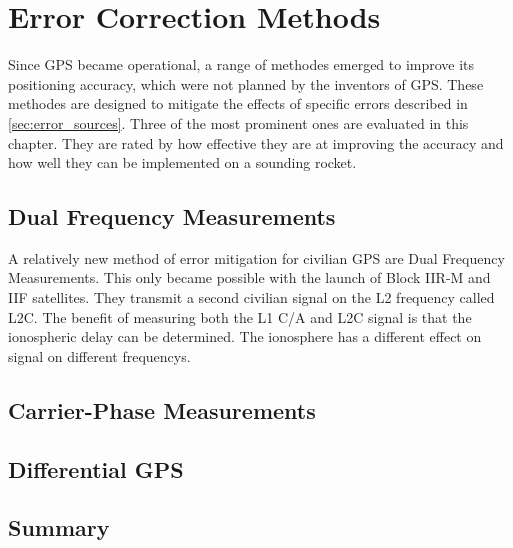 \chapter{Error Correction Methods}

Since GPS became operational, a range of methodes emerged to improve its positioning accuracy, which were not planned by the inventors of GPS.
These methodes are designed to mitigate the effects of specific errors described in \ref{sec:error_sources}.
Three of the most prominent ones are evaluated in this chapter.
They are rated by how effective they are at improving the accuracy and how well they can be implemented on a sounding rocket.


\section{Dual Frequency Measurements}

A relatively new method of error mitigation for civilian GPS are Dual Frequency Measurements.
This only became possible with the launch of Block IIR-M and IIF satellites.
They transmit a second civilian signal on the L2 frequency called L2C.
The benefit of measuring both the L1 C/A and L2C signal is that the ionospheric delay can be determined.
The ionosphere has a different effect on signal on different frequencys.


\section{Carrier-Phase Measurements}

\section{Differential GPS}

\section{Summary}
